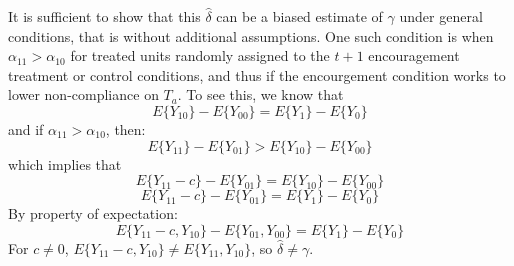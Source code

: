 \documentclass{article}
\begin{document}
\begin{itemize}
\begin{itemize}
It is sufficient to show that this $\hat{\delta}$ can be a biased
estimate of $\gamma$ under general conditions, that is without
additional assumptions.  One such condition is when
$\alpha_{11}>\alpha_{10}$ for treated units randomly assigned to
the $t+1$ encouragement treatment or control conditions, and thus if
the encourgement condition works to lower non-compliance on $T_a$. To
see this, we know that
 $$E\{Y_{10}\}-E\{Y_{00}\}=E\{Y_{1}\}-E\{Y_{0}\}$$
and if $\alpha_{11}>\alpha_{10}$, then:
$$E\{Y_{11}\}-E\{Y_{01}\}>E\{Y_{10}\}-E\{Y_{00}\}$$
which implies that
$$E\{Y_{11}-c\}-E\{Y_{01}\}=E\{Y_{10}\}-E\{Y_{00}\}$$
$$E\{Y_{11}-c\}-E\{Y_{01}\}=E\{Y_{1}\}-E\{Y_{0}\}$$
By property of expectation:
$$E\{Y_{11}-c,Y_{10}\}-E\{Y_{01},Y_{00}\}=E\{Y_{1}\}-E\{Y_{0}\}$$
For $c\neq0$, $E\{Y_{11}-c,Y_{10}\}\neq E\{Y_{11},Y_{10}\}$, so $\hat{\delta}\neq\gamma$.


\end{itemize}
\vspace{1em}


\end{itemize}
\end{document}
